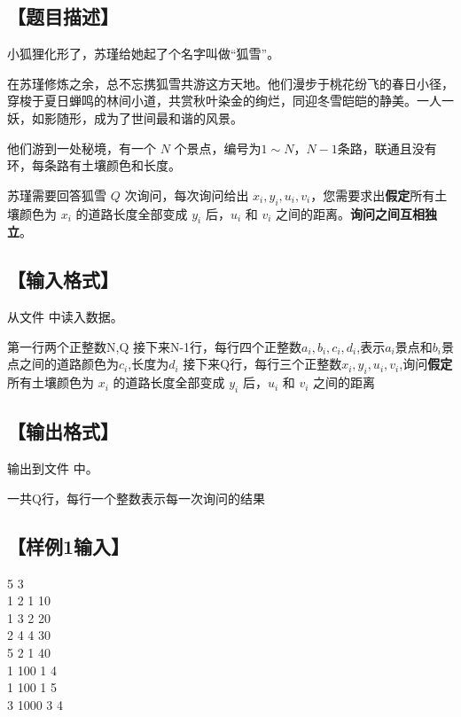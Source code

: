 \documentclass{statement}
\begin{document}
    \subsection[题目描述]{【题目描述】}

	小狐狸化形了，苏瑾给她起了个名字叫做“狐雪”。
	
	在苏瑾修炼之余，总不忘携狐雪共游这方天地。他们漫步于桃花纷飞的春日小径，穿梭于夏日蝉鸣的林间小道，共赏秋叶染金的绚烂，同迎冬雪皑皑的静美。一人一妖，如影随形，成为了世间最和谐的风景。
	
	他们游到一处秘境，有一个 $N$ 个景点，编号为$1\sim N$，$N-1$条路，联通且没有环，每条路有土壤颜色和长度。
	
	苏瑾需要回答狐雪 $Q$ 次询问，每次询问给出 $x_i,y_i,u_i,v_i$，您需要求出\textbf{假定}所有土壤颜色为 $x_i$ 的道路长度全部变成 $y_i$ 后，$u_i$ 和 $v_i$ 之间的距离。\textbf{询问之间互相独立}。
	

    \subsection[输入格式]{【输入格式】}
    从文件  中读入数据。

    第一行两个正整数N,Q
    接下来N-1行，每行四个正整数$a_i,b_i,c_i,d_i$,表示$a_i$景点和$b_i$景点之间的道路颜色为$c_i$,长度为$d_i$
    接下来Q行，每行三个正整数$x_i,y_i,u_i,v_i$,询问\textbf{假定}所有土壤颜色为 $x_i$ 的道路长度全部变成 $y_i$ 后，$u_i$ 和 $v_i$ 之间的距离
    
    \subsection[输出格式]{【输出格式】}
    输出到文件  中。
	
	一共Q行，每行一个整数表示每一次询问的结果

    \subsection[样例1输入]{【样例1输入】}
    \begin{example}
5 3\\
1 2 1 10\\
1 3 2 20\\
2 4 4 30\\
5 2 1 40\\
1 100 1 4\\
1 100 1 5\\
3 1000 3 4
    \end{example}
\end{document}

